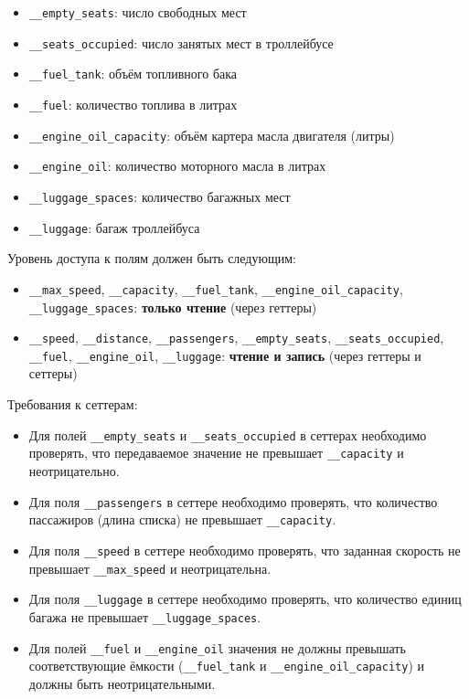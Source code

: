 \begin{enumerate}
\begin{itemize}
    \item \texttt{\_\_empty\_seats}: число свободных мест  
    \item \texttt{\_\_seats\_occupied}: число занятых мест в троллейбусе  
    \item \texttt{\_\_fuel\_tank}: объём топливного бака  
    \item \texttt{\_\_fuel}: количество топлива в литрах  
    \item \texttt{\_\_engine\_oil\_capacity}: объём картера масла двигателя (литры)  
    \item \texttt{\_\_engine\_oil}: количество моторного масла в литрах  
    \item \texttt{\_\_luggage\_spaces}: количество багажных мест  
    \item \texttt{\_\_luggage}: багаж троллейбуса  
\end{itemize}
Уровень доступа к полям должен быть следующим:
\begin{itemize}
    \item \texttt{\_\_max\_speed}, \texttt{\_\_capacity}, \texttt{\_\_fuel\_tank}, \texttt{\_\_engine\_oil\_capacity}, \texttt{\_\_luggage\_spaces}: \textbf{только чтение} (через геттеры)  
    \item \texttt{\_\_speed}, \texttt{\_\_distance}, \texttt{\_\_passengers}, \texttt{\_\_empty\_seats}, \texttt{\_\_seats\_occupied}, \texttt{\_\_fuel}, \texttt{\_\_engine\_oil}, \texttt{\_\_luggage}: \textbf{чтение и запись} (через геттеры и сеттеры)
\end{itemize}
Требования к сеттерам:
\begin{itemize}
    \item Для полей \texttt{\_\_empty\_seats} и \texttt{\_\_seats\_occupied} в сеттерах необходимо проверять, что передаваемое значение не превышает \texttt{\_\_capacity} и неотрицательно.  
    \item Для поля \texttt{\_\_passengers} в сеттере необходимо проверять, что количество пассажиров (длина списка) не превышает \texttt{\_\_capacity}.  
    \item Для поля \texttt{\_\_speed} в сеттере необходимо проверять, что заданная скорость не превышает \texttt{\_\_max\_speed} и неотрицательна.  
    \item Для поля \texttt{\_\_luggage} в сеттере необходимо проверять, что количество единиц багажа не превышает \texttt{\_\_luggage\_spaces}.
    \item Для полей \texttt{\_\_fuel} и \texttt{\_\_engine\_oil} значения не должны превышать соответствующие ёмкости (\texttt{\_\_fuel\_tank} и \texttt{\_\_engine\_oil\_capacity}) и должны быть неотрицательными.

\end{itemize}
\end{enumerate}
